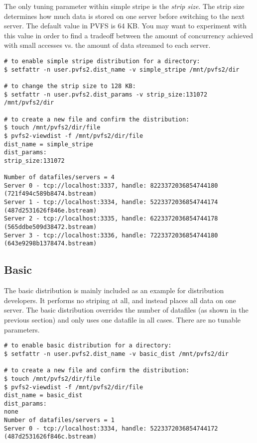 \documentclass[11pt,letterpaper]{article}
\begin{document}
The only tuning parameter within simple stripe is the \emph{strip size}.
The strip size determines how much data is stored on one server before
switching to the next server.  The default value in PVFS is 64 KB.  You
may want to experiment with this value in order to find a tradeoff
between the amount of concurrency achieved with small accesses vs. the
amount of data streamed to each server.

\begin{verbatim}
# to enable simple stripe distribution for a directory:
$ setfattr -n user.pvfs2.dist_name -v simple_stripe /mnt/pvfs2/dir

# to change the strip size to 128 KB:
$ setfattr -n user.pvfs2.dist_params -v strip_size:131072 /mnt/pvfs2/dir

# to create a new file and confirm the distribution:
$ touch /mnt/pvfs2/dir/file
$ pvfs2-viewdist -f /mnt/pvfs2/dir/file
dist_name = simple_stripe
dist_params:
strip_size:131072

Number of datafiles/servers = 4
Server 0 - tcp://localhost:3337, handle: 8223372036854744180 (721f494c589b8474.bstream)
Server 1 - tcp://localhost:3334, handle: 5223372036854744174 (487d2531626f846e.bstream)
Server 2 - tcp://localhost:3335, handle: 6223372036854744178 (565ddbe509d38472.bstream)
Server 3 - tcp://localhost:3336, handle: 7223372036854744180 (643e9298b1378474.bstream)
\end{verbatim}

\subsection{Basic}

The basic distribution is mainly included as an example for distribution
developers.  It performs no striping at all, and instead places all
data on one server.  The basic distribution overrides the number of
datafiles (as shown in the previous section) and only uses one datafile
in all cases.  There are no tunable parameters.

\begin{verbatim}
# to enable basic distribution for a directory:
$ setfattr -n user.pvfs2.dist_name -v basic_dist /mnt/pvfs2/dir

# to create a new file and confirm the distribution:
$ touch /mnt/pvfs2/dir/file
$ pvfs2-viewdist -f /mnt/pvfs2/dir/file
dist_name = basic_dist
dist_params:
none
Number of datafiles/servers = 1
Server 0 - tcp://localhost:3334, handle: 5223372036854744172 (487d2531626f846c.bstream)
\end{verbatim}
\end{document}
